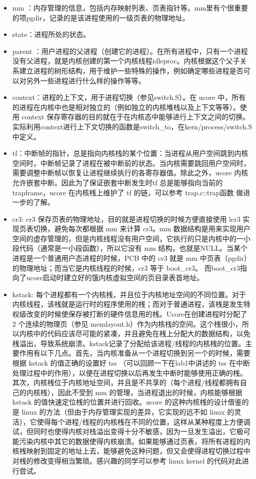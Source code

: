 \begin{itemize}
\tightlist
\item
  mm
  ：内存管理的信息，包括内存映射列表、页表指针等。mm里有个很重要的项pgdir，记录的是该进程使用的一级页表的物理地址。
\item
  state：进程所处的状态。
\item
  parent
  ：用户进程的父进程（创建它的进程）。在所有进程中，只有一个进程没有父进程，就是内核创建的第一个内核线程idleproc。内核根据这个父子关系建立进程的树形结构，用于维护一些特殊的操作，例如确定哪些进程是否可以对另外一些进程进行什么样的操作等等。
\item
  context：进程的上下文，用于进程切换（参见switch.S）。在 ucore
  中，所有的进程在内核中也是相对独立的（例如独立的内核堆栈以及上下文等等）。使用
  context
  保存寄存器的目的就在于在内核态中能够进行上下文之间的切换。实际利用context进行上下文切换的函数是switch\_to，在kern/process/switch.S中定义。
\item
  tf：中断帧的指针，总是指向内核栈的某个位置：当进程从用户空间跳到内核空间时，中断帧记录了进程在被中断前的状态。当内核需要跳回用户空间时，需要调整中断帧以恢复让进程继续执行的各寄存器值。除此之外，ucore
  内核允许嵌套中断。因此为了保证嵌套中断发生时tf 总是能够指向当前的
  trapframe，ucore 在内核桟上维护了 tf 的链，可以参考 trap.c::trap函数
  做进一步的了解。
\item
  cr3: cr3 保存页表的物理地址，目的就是进程切换的时候方便直接使用 lcr3
  实现页表切换，避免每次都根据 mm 来计算 cr3。mm
  数据结构是用来实现用户空间的虚存管理的，但是内核线程没有用户空间，它执行的只是内核中的一小段代码（通常是一小段函数），所以它没有
  mm 结构，也就是NULL。当某个进程是一个普通用户态进程的时候，PCB 中的
  cr3 就是 mm 中页表（pgdir）的物理地址；而当它是内核线程的时候，cr3
  等于 boot\_cr3。
  而boot\_cr3指向了ucore启动时建立好的饿内核虚拟空间的页目录表首地址。
\item
  kstack:
  每个进程都有一个内核桟，并且位于内核地址空间的不同位置。对于内核线程，该桟就是运行时的程序使用的桟；而对于普通进程，该桟是发生特权级改变的时候使保存被打断的硬件信息用的桟。Ucore在创建进程时分配了
  2 个连续的物理页（参见
  memlayout.h）作为内核栈的空间。这个桟很小，所以内核中的代码应该尽可能的紧凑，并且避免在桟上分配大的数据结构，以免桟溢出，导致系统崩溃。kstack记录了分配给该进程/线程的内核桟的位置。主要作用有以下几点。首先，当内核准备从一个进程切换到另一个的时候，需要根据
  kstack 的值正确的设置好 tss （可以回顾一下在lab1中讲述的 tss
  在中断处理过程中的作用），以便在进程切换以后再发生中断时能够使用正确的桟。其次，内核桟位于内核地址空间，并且是不共享的（每个进程/线程都拥有自己的内核桟），因此不受到
  mm 的管理，当进程退出的时候，内核能够根据 kstack
  的值快速定位桟的位置并进行回收。ucore 的这种内核桟的设计借鉴的是 linux
  的方法（但由于内存管理实现的差异，它实现的远不如 linux
  的灵活），它使得每个进程/线程的内核桟在不同的位置，这样从某种程度上方便调试，但同时也使得内核对栈溢出变得十分不敏感，因为一旦发生溢出，它极可能污染内核中其它的数据使得内核崩溃。如果能够通过页表，将所有进程的内核桟映射到固定的地址上去，能够避免这种问题，但又会使得进程切换过程中对桟的修改变得相当繁琐。感兴趣的同学可以参考
  linux kernel 的代码对此进行尝试。
\end{itemize}

